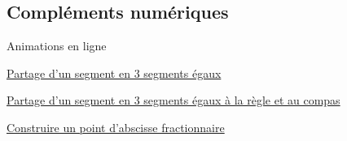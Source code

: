 \subsection{Compléments numériques}
\begin{center}
    \begin{myBox}{  Animations en ligne}
        \begin{flushleft}        
            \href{http://lozano.maths.free.fr/iep_local/figures_html/scr_iep_015.html}{ Partage d'un segment en 3 segments égaux}

            \href{http://lozano.maths.free.fr/iep_local/figures_html/scr_iep_125.html}{ Partage d'un segment en 3 segments égaux à la règle et au compas}

            \href{http://lozano.maths.free.fr/iep_local/figures_html/scr_iep_159.html}{  Construire un point d'abscisse fractionnaire}
        \end{flushleft}
    
        \creditInstrumentPoche
    \end{myBox}

\end{center}